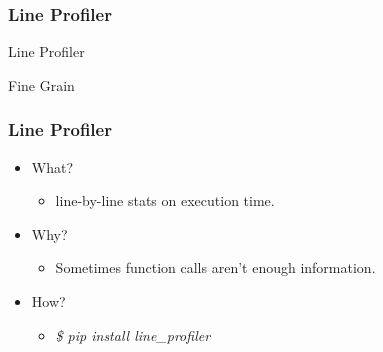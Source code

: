 \documentclass[c,english]{beamer}
\providecommand*{\DUroletitlereference}[1]{\textsl{#1}}
\begin{document}
\begin{frame}[fragile]
\frametitle{Line Profiler}


\begin{block}{ \centering \LARGE Line Profiler }

\centering \Large Fine Grain

\end{block}
\end{frame}

\begin{frame}[fragile]
\frametitle{Line Profiler}

\begin{itemize}

\item What?
\begin{itemize}

\item line-by-line stats on execution time.
\end{itemize}

\item Why?
\begin{itemize}

\item Sometimes function calls aren't enough information.
\end{itemize}

\item How?
\begin{itemize}

\item \DUroletitlereference{\$ pip install line\_profiler}
\end{itemize}
\end{itemize}
\end{frame}
\end{document}
